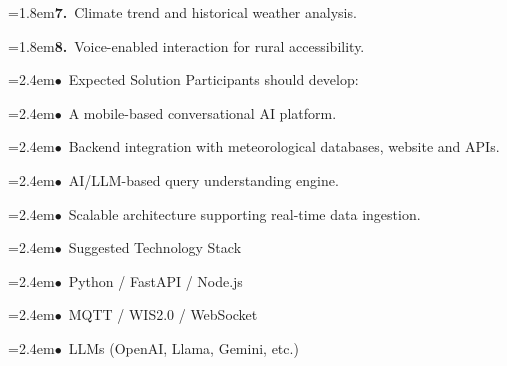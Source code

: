 \documentclass[10pt,a4paper]{article}
\begin{document}
\begin{tcolorbox}[pscard, title={"\textbf{SIH26068} \quad $\vert$ \quad WeatherGPT: Conversational AI for Weather Forecasting, Alerts, and Climate ...}]
\noindent\hangindent=1.8em\textbf{7.}~\small Climate trend and historical weather analysis.\par\vspace{0.06cm}
\noindent\hangindent=1.8em\textbf{8.}~\small Voice-enabled interaction for rural accessibility.\par\vspace{0.06cm}
\noindent\hspace*{1.2em}\hangindent=2.4em\textcolor{sihblue}{$\bullet$}~\small Expected Solution Participants should develop:\par\vspace{0.05cm}
\noindent\hspace*{1.2em}\hangindent=2.4em\textcolor{sihblue}{$\bullet$}~\small A mobile-based conversational AI platform.\par\vspace{0.05cm}
\noindent\hspace*{1.2em}\hangindent=2.4em\textcolor{sihblue}{$\bullet$}~\small Backend integration with meteorological databases, website and APIs.\par\vspace{0.05cm}
\noindent\hspace*{1.2em}\hangindent=2.4em\textcolor{sihblue}{$\bullet$}~\small AI/LLM-based query understanding engine.\par\vspace{0.05cm}
\noindent\hspace*{1.2em}\hangindent=2.4em\textcolor{sihblue}{$\bullet$}~\small Scalable architecture supporting real-time data ingestion.\par\vspace{0.05cm}
\noindent\hspace*{1.2em}\hangindent=2.4em\textcolor{sihblue}{$\bullet$}~\small Suggested Technology Stack\par\vspace{0.05cm}
\noindent\hspace*{1.2em}\hangindent=2.4em\textcolor{sihblue}{$\bullet$}~\small Python / FastAPI / Node.js\par\vspace{0.05cm}
\noindent\hspace*{1.2em}\hangindent=2.4em\textcolor{sihblue}{$\bullet$}~\small MQTT / WIS2.0 / WebSocket\par\vspace{0.05cm}
\noindent\hspace*{1.2em}\hangindent=2.4em\textcolor{sihblue}{$\bullet$}~\small LLMs (OpenAI, Llama, Gemini, etc.)\par\vspace{0.05cm}

\end{tcolorbox}
\end{document}
